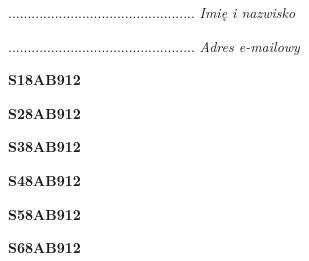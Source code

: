 \begin{turn}{90}\begin{minipage}{\linewidth} \vspace{20mm} ................................................  \textit{Imię i nazwisko}\end{minipage}\end{turn}

\begin{turn}{90}\begin{minipage}{\linewidth} \vspace{20mm} ................................................  \textit{Adres e-mailowy}\end{minipage}\end{turn}

\begin{turn}{90}\huge \begin{minipage}{\linewidth} \vspace{10mm}\textbf{S18AB912}\end{minipage}\end{turn}

\begin{turn}{90}\huge \begin{minipage}{\linewidth} \vspace{10mm}\textbf{S28AB912}\end{minipage}\end{turn}

\begin{turn}{90}\huge \begin{minipage}{\linewidth} \vspace{10mm}\textbf{S38AB912}\end{minipage}\end{turn}

\begin{turn}{90}\huge \begin{minipage}{\linewidth} \vspace{10mm}\textbf{S48AB912}\end{minipage}\end{turn}

\begin{turn}{90}\huge \begin{minipage}{\linewidth} \vspace{10mm}\textbf{S58AB912}\end{minipage}\end{turn}

\begin{turn}{90}\huge \begin{minipage}{\linewidth} \vspace{10mm}\textbf{S68AB912}\end{minipage}\end{turn}

